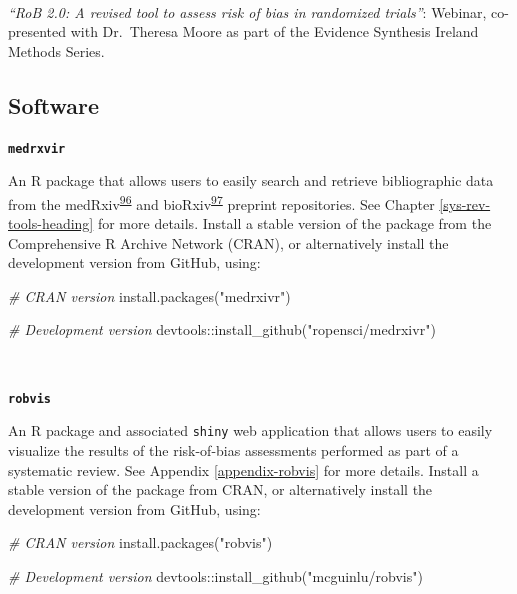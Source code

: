 \documentclass[a4paper, twoside]{templates/ociamthesis}
\newenvironment{Shaded}{\begin{snugshade}}{\end{snugshade}}
\newcommand{\CommentTok}[1]{\textcolor[rgb]{0.56,0.35,0.01}{\textit{#1}}}
\newcommand{\FunctionTok}[1]{\textcolor[rgb]{0.00,0.00,0.00}{#1}}
\newcommand{\NormalTok}[1]{#1}
\newcommand{\SpecialCharTok}[1]{\textcolor[rgb]{0.00,0.00,0.00}{#1}}
\newcommand{\StringTok}[1]{\textcolor[rgb]{0.31,0.60,0.02}{#1}}
\renewenvironment{Shaded}
{
  \vspace{4pt}%
  \begin{snugshade}%
}{%
  \end{snugshade}%
  \vspace{4pt}%
}
\begin{document}
~

\emph{``RoB 2.0: A revised tool to assess risk of bias in randomized trials''}: Webinar, co-presented with Dr.~Theresa Moore as part of the Evidence Synthesis Ireland Methods Series.

\hypertarget{outputs-software}{%
\subsection{Software}\label{outputs-software}}

\textbf{\texttt{medrxvir}}

An R package that allows users to easily search and retrieve bibliographic data from the medRxiv\textsuperscript{\protect\hyperlink{ref-rawlinson2019}{96}} and bioRxiv\textsuperscript{\protect\hyperlink{ref-sever2019}{97}} preprint repositories. See Chapter \ref{sys-rev-tools-heading} for more details. Install a stable version of the package from the Comprehensive R Archive Network (CRAN), or alternatively install the development version from GitHub, using:

\begin{Shaded}
\begin{Highlighting}[]
\CommentTok{\# CRAN version}
\FunctionTok{install.packages}\NormalTok{(}\StringTok{"medrxivr"}\NormalTok{)}

\CommentTok{\# Development version}
\NormalTok{devtools}\SpecialCharTok{::}\FunctionTok{install\_github}\NormalTok{(}\StringTok{"ropensci/medrxivr"}\NormalTok{)}
\end{Highlighting}
\end{Shaded}

~

\textbf{\texttt{robvis}}

An R package and associated \texttt{shiny} web application that allows users to easily visualize the results of the risk-of-bias assessments performed as part of a systematic review. See Appendix \ref{appendix-robvis} for more details. Install a stable version of the package from CRAN, or alternatively install the development version from GitHub, using:

\begin{Shaded}
\begin{Highlighting}[]
\CommentTok{\# CRAN version}
\FunctionTok{install.packages}\NormalTok{(}\StringTok{"robvis"}\NormalTok{)}

\CommentTok{\# Development version}
\NormalTok{devtools}\SpecialCharTok{::}\FunctionTok{install\_github}\NormalTok{(}\StringTok{"mcguinlu/robvis"}\NormalTok{)}
\end{Highlighting}
\end{Shaded}
\end{document}
